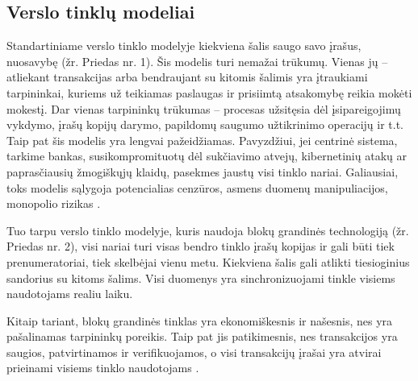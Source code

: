 \documentclass{VUMIFPSkursinis}
\begin{document}
\subsection{Verslo tinklų modeliai}
Standartiniame verslo tinklo modelyje kiekviena šalis saugo savo įrašus, nuosavybę (žr. Priedas nr. 1). Šis modelis turi nemažai trūkumų. Vienas jų – atliekant transakcijas arba bendraujant su kitomis šalimis yra įtraukiami tarpininkai, kuriems už teikiamas paslaugas ir prisiimtą atsakomybę reikia mokėti mokestį. Dar vienas tarpininkų trūkumas – procesas užsitęsia dėl įsipareigojimų vykdymo, įrašų kopijų darymo, papildomų saugumo užtikrinimo operacijų ir t.t. Taip pat šis modelis yra lengvai pažeidžiamas. Pavyzdžiui, jei centrinė sistema, tarkime bankas, susikompromituotų dėl sukčiavimo atvejų, kibernetinių atakų ar paprasčiausių žmogiškųjų klaidų, pasekmes jaustų visi tinklo nariai. Galiausiai, toks modelis sąlygoja potencialias cenzūros, asmens duomenų manipuliacijos, monopolio rizikas \cite{catalini2017some}.

Tuo tarpu verslo tinklo modelyje, kuris naudoja blokų grandinės technologiją (žr. Priedas nr. 2), visi nariai turi visas bendro tinklo įrašų kopijas ir gali būti tiek prenumeratoriai, tiek skelbėjai vienu metu. Kiekviena šalis gali atlikti tiesioginius sandorius su kitoms šalims. Visi duomenys yra sinchronizuojami tinkle visiems naudotojams realiu laiku.

Kitaip tariant, blokų grandinės tinklas yra ekonomiškesnis ir našesnis, nes yra pašalinamas tarpininkų poreikis. Taip pat jis patikimesnis, nes transakcijos yra saugios, patvirtinamos ir verifikuojamos, o visi transakcijų įrašai yra atvirai prieinami visiems tinklo naudotojams \cite{chiu2017economics}.
\end{document}
